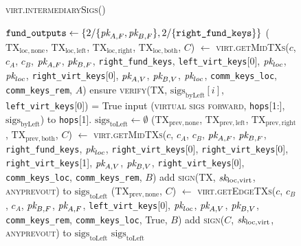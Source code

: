 \begin{figure}[H]
  \begin{processbox}{\textsc{virt.intermediarySigs}()}
    \begin{algorithmic}[1]
      \State $\texttt{fund\_outputs} \gets \{ 2/\{\textit{pk}_{A, F}, \textit{pk}_{B, F}\}, 2/\{
      \texttt{right\_fund\_keys}\} \}$
      \State ($\mathrm{TX}_{\mathrm{loc}, \mathrm{none}}$,
      $\mathrm{TX}_{\mathrm{loc}, \mathrm{left}}$, $\mathrm{TX}_{\mathrm{loc},
      \mathrm{right}}$, $\mathrm{TX}_{\mathrm{loc}, \mathrm{both}}$, $C$)
      $\gets$ \textsc{virt.getMidTXs}($c$, $c_A$, $c_B$, $\textit{pk}_{A, F}$, $\textit{pk}_{B,
      F}$, \texttt{right\_fund\_keys}, \texttt{left\_virt\_keys}[0], $\textit{pk}_{loc}$,
      $\textit{pk}_{loc}$, \texttt{right\_virt\_keys}[0], $\textit{pk}_{A, V}$, $\textit{pk}_{B, V}$,
      $\textit{pk}_{loc}$, \texttt{comm\_keys\_loc}, \texttt{comm\_keys\_rem}, $A$)
        \State ensure \textsc{verify}(TX, $\mathrm{sigs}_{\mathrm{byLeft}}[i]$,
        \texttt{left\_virt\_keys}[0]) = True
      \EndFor
      \State input (\textsc{virtual sigs forward}, \texttt{hops}[1:],
      $\mathrm{sigs}_{\mathrm{byLeft}}$) to \texttt{hops}[1].\alice{}
      \State {}
      \State $\mathrm{sigs}_{\mathrm{toLeft}} \gets \emptyset$
       
        \State ($\mathrm{TX}_{\mathrm{prev}, \mathrm{none}}$,
        $\mathrm{TX}_{\mathrm{prev}, \mathrm{left}}$,
        $\mathrm{TX}_{\mathrm{prev}, \mathrm{right}}$,
        $\mathrm{TX}_{\mathrm{prev}, \mathrm{both}}$, $C$) $\gets$
        \textsc{virt.getMidTXs}($c$, $c_A$, $c_B$, $\textit{pk}_{A, F}$, $\textit{pk}_{B, F}$,
        \texttt{right\_fund\_keys}, $\textit{pk}_{loc}$, \texttt{right\_virt\_keys}[0],
        \texttt{right\_virt\_keys}[0], \texttt{right\_virt\_keys}[1], $\textit{pk}_{A,
        V}$, $\textit{pk}_{B, V}$, \texttt{right\_virt\_keys}[0],
        \texttt{comm\_keys\_loc}, \texttt{comm\_keys\_rem}, $B$)
          \State add \textsc{sign}(TX, $\textit{sk}_{\mathrm{loc}, \mathrm{virt}}$,
          \textsc{anyprevout}) to $\mathrm{sigs}_{\mathrm{toLeft}}$
        \EndFor
      \Else \: 
        \State ($\mathrm{TX}_{\mathrm{prev}, \mathrm{none}}$, $C$) $\gets$
        \textsc{virt.getEdgeTXs}($c$, $c_B$, $c_A$, $\textit{pk}_{B, F}$, $\textit{pk}_{A, F}$,
        \texttt{left\_virt\_keys}[0], $\textit{pk}_{loc}$,  $\textit{pk}_{A, V}$, $\textit{pk}_{B, V}$,
        \texttt{comm\_keys\_rem}, \texttt{comm\_keys\_loc}, True, $B$)
        \State add \textsc{sign}($C$, $\textit{sk}_{\mathrm{loc}, \mathrm{virt}}$,
        \textsc{anyprevout}) to $\mathrm{sigs}_{\mathrm{toLeft}}$
      \EndIf
      \State \Return $\mathrm{sigs}_{\mathrm{toLeft}}$
    \end{algorithmic}
  \end{processbox}
  \caption{}
  \label{code:virtual-layer:intermediary-sigs}
\end{figure}

